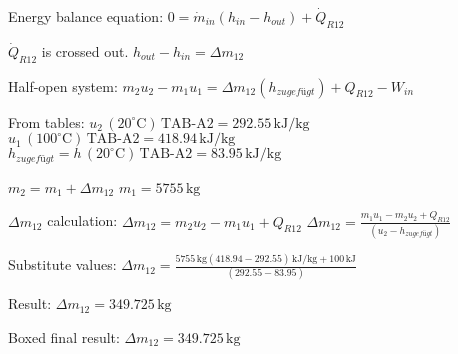 Energy balance equation:  
\( 0 = \dot{m}_{in} (h_{in} - h_{out}) + \dot{Q}_{R12} \)  

\( \dot{Q}_{R12} \) is crossed out.  
\( h_{out} - h_{in} = \Delta m_{12} \)  

Half-open system:  
\( m_2 u_2 - m_1 u_1 = \Delta m_{12} (h_{zugefügt}) + Q_{R12} - W_{in} \)  

From tables:  
\( u_2 \, (20^\circ \text{C}) \, \text{TAB-A2} = 292.55 \, \text{kJ/kg} \)  
\( u_1 \, (100^\circ \text{C}) \, \text{TAB-A2} = 418.94 \, \text{kJ/kg} \)  
\( h_{zugefügt} = h \, (20^\circ \text{C}) \, \text{TAB-A2} = 83.95 \, \text{kJ/kg} \)  

\( m_2 = m_1 + \Delta m_{12} \)  
\( m_1 = 5755 \, \text{kg} \)  

\( \Delta m_{12} \) calculation:  
\( \Delta m_{12} = m_2 u_2 - m_1 u_1 + Q_{R12} \)  
\( \Delta m_{12} = \frac{m_1 u_1 - m_2 u_2 + Q_{R12}}{(u_2 - h_{zugefügt})} \)  

Substitute values:  
\( \Delta m_{12} = \frac{5755 \, \text{kg} (418.94 - 292.55) \, \text{kJ/kg} + 100 \, \text{kJ}}{(292.55 - 83.95)} \)  

Result:  
\( \Delta m_{12} = 349.725 \, \text{kg} \)  

Boxed final result:  
\( \Delta m_{12} = 349.725 \, \text{kg} \)